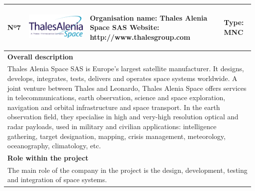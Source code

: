 \begin{longtable}[H]{|p{0.7cm}|p{4cm}|p{7cm}|p{1.3cm}|}
	\hline
	\begin{center} Nº7 \end{center} & \begin{center} \includegraphics[scale=0.25]{./logos/Thales_Alenia_Space_Belgium_logo} \end{center} & \begin{center} \textbf{Organisation name:} Thales Alenia Space SAS \newline \textbf{Website:} http://www.thalesgroup.com \end{center} & \begin{center} Type: \newline MNC \end{center} \\ \hline
	
	\multicolumn{4}{|p{13cm}|}{\textbf{Overall description}}  \\ \hline
	
	\multicolumn{4}{|p{14.5cm}|}{Thales Alenia Space SAS is Europe's largest satellite manufacturer. It designs, develops, integrates, tests, delivers and operates space systems worldwide. A joint venture between Thales and Leonardo, Thales Alenia Space offers services in telecommunications, earth observation, science and space exploration, navigation and orbital infrastructure and space transport. In the earth observation field, they specialise in high and very-high resolution optical and radar payloads, used in military and civilian applications: intelligence gathering, target designation, mapping, crisis management, meteorology, oceanography, climatology, etc.}  \\ \hline
	
	\multicolumn{4}{|p{13cm}|}{\textbf{Role within the project}}   \\ \hline
	
	\multicolumn{4}{|p{14.5cm}|}{The main role of the company in the project is the design, development, testing and integration of space systems.}  \\ \hline
	

\end{longtable}
